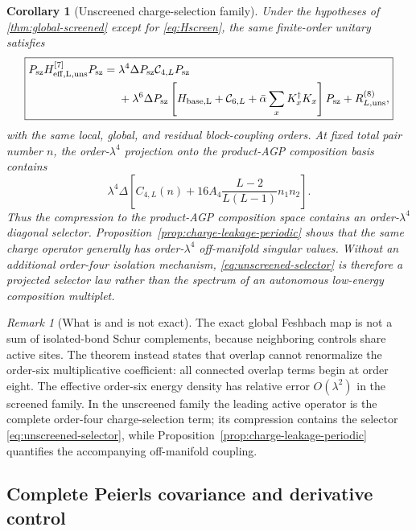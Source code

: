 \documentclass[11pt]{article}
\newtheorem{corollary}[theorem]{Corollary}
\theoremstyle{definition}
\theoremstyle{remark}
\newtheorem{remark}[theorem]{Remark}
\newcommand{\cC}{\mathcal C}
\begin{document}
\begin{corollary}[Unscreened charge-selection family]
\label{cor:global-unscreened}
Under the hypotheses of \cref{thm:global-screened} except for \eqref{eq:Hscreen}, the same finite-order unitary satisfies
\begin{equation}
\boxed{
\begin{aligned}
P_{\rm sz}H_{\rm eff,L,{\rm uns}}^{[7]}P_{\rm sz}
={}&\lambda^4\Delta P_{\rm sz}\cC_{4,L}P_{\rm sz}\\
&+\lambda^6\Delta P_{\rm sz}\left[H_{\rm base,L}+\cC_{6,L}+\bar\alpha\sum_xK_x^\dagger K_x\right]P_{\rm sz}
+R_{L,{\rm uns}}^{(8)},
\end{aligned}}
\label{eq:global-unscreened-theorem}
\end{equation}
with the same local, global, and residual block-coupling orders.  At fixed total pair number $n$, the order-$\lambda^4$ projection onto the product-AGP composition basis contains
\begin{equation}
 \lambda^4\Delta\left[C_{4,L}(n)+16A_4\frac{L-2}{L(L-1)}n_1n_2\right].
 \label{eq:unscreened-selector}
\end{equation}
Thus the compression to the product-AGP composition space contains an order-$\lambda^4$ diagonal selector.  Proposition~\ref{prop:charge-leakage-periodic} shows that the same charge operator generally has order-$\lambda^4$ off-manifold singular values.  Without an additional order-four isolation mechanism, \eqref{eq:unscreened-selector} is therefore a projected selector law rather than the spectrum of an autonomous low-energy composition multiplet.
\end{corollary}

\begin{remark}[What is and is not exact]
The exact global Feshbach map is not a sum of isolated-bond Schur complements, because neighboring controls share active sites.  The theorem instead states that overlap cannot renormalize the order-six multiplicative coefficient: all connected overlap terms begin at order eight.  The effective order-six energy density has relative error $O(\lambda^2)$ in the screened family.  In the unscreened family the leading active operator is the complete order-four charge-selection term; its compression contains the selector \eqref{eq:unscreened-selector}, while Proposition~\ref{prop:charge-leakage-periodic} quantifies the accompanying off-manifold coupling.
\end{remark}

\subsection{Complete Peierls covariance and derivative control}
\end{document}
